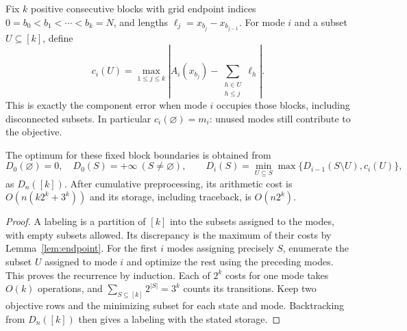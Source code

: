Fix $k$ positive consecutive blocks with grid endpoint indices
$0=b_0<b_1<\cdots<b_k=N$, and lengths
$\ell_j=x_{b_j}-x_{b_{j-1}}$. For mode $i$ and a subset
$U\subseteq[k]$, define
\begin{equation}\label{eq:block-subset-cost}
 c_i(U)=\max_{1\le j\le k}
 \left|A_i(x_{b_j})-\sum_{\substack{h\in U\\h\le j}}\ell_h\right|.
\end{equation}
This is exactly the component error when mode $i$ occupies those blocks,
including disconnected subsets. In particular $c_i(\varnothing)=m_i$:
unused modes still contribute to the objective.

\begin{proposition}\label{prop:subset-DP}
The optimum for these fixed block boundaries is obtained from
\begin{equation}\label{eq:subset-DP}
 D_0(\varnothing)=0,\quad D_0(S)=+\infty\ (S\ne\varnothing),
 \qquad
 D_i(S)=\min_{U\subseteq S}\max\{D_{i-1}(S\setminus U),c_i(U)\},
\end{equation}
as $D_n([k])$. After cumulative preprocessing, its arithmetic cost is
$O(n(k2^k+3^k))$ and its storage, including traceback, is $O(n2^k)$.
\end{proposition}
\begin{proof}
A labeling is a partition of $[k]$ into the subsets assigned to the modes,
with empty subsets allowed. Its discrepancy is the maximum of their costs
by Lemma~\ref{lem:endpoint}. For the first $i$ modes assigning precisely
$S$, enumerate the subset $U$ assigned to mode $i$ and optimize the rest
using the preceding modes. This proves the recurrence by induction.
Each of $2^k$ costs for one mode takes $O(k)$ operations, and
$\sum_{S\subseteq[k]}2^{|S|}=3^k$ counts its transitions. Keep two objective
rows and the minimizing subset for each state and mode. Backtracking from
$D_n([k])$ then gives a labeling with the stated storage.
\end{proof}


